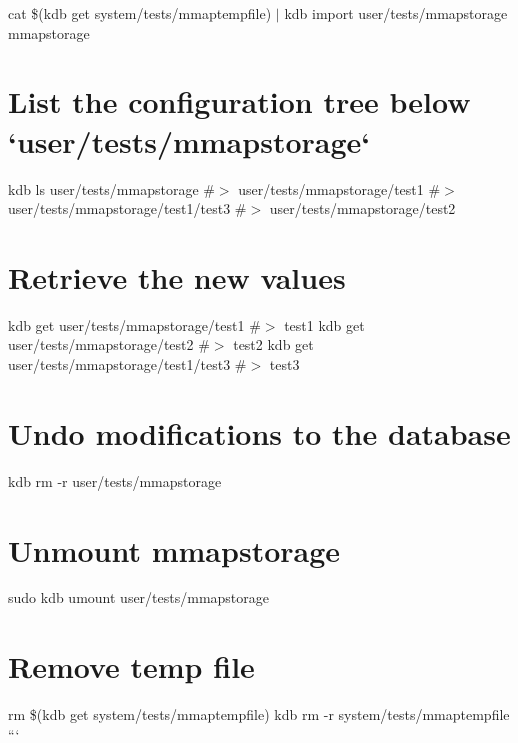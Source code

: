 cat \$(kdb get system/tests/mmaptempfile) $\vert$ kdb import user/tests/mmapstorage mmapstorage\hypertarget{autotoc_md444_autotoc_md461}{}\section{List the configuration tree below `user/tests/mmapstorage`}\label{autotoc_md444_autotoc_md461}
kdb ls user/tests/mmapstorage \#$>$ user/tests/mmapstorage/test1 \#$>$ user/tests/mmapstorage/test1/test3 \#$>$ user/tests/mmapstorage/test2\hypertarget{autotoc_md444_autotoc_md462}{}\section{Retrieve the new values}\label{autotoc_md444_autotoc_md462}
kdb get user/tests/mmapstorage/test1 \#$>$ test1 kdb get user/tests/mmapstorage/test2 \#$>$ test2 kdb get user/tests/mmapstorage/test1/test3 \#$>$ test3\hypertarget{autotoc_md444_autotoc_md463}{}\section{Undo modifications to the database}\label{autotoc_md444_autotoc_md463}
kdb rm -\/r user/tests/mmapstorage\hypertarget{autotoc_md444_autotoc_md464}{}\section{Unmount mmapstorage}\label{autotoc_md444_autotoc_md464}
sudo kdb umount user/tests/mmapstorage\hypertarget{autotoc_md444_autotoc_md465}{}\section{Remove temp file}\label{autotoc_md444_autotoc_md465}
rm \$(kdb get system/tests/mmaptempfile) kdb rm -\/r system/tests/mmaptempfile ``` 